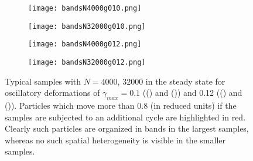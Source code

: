 \begin{figure}
	\centering
	\begin{subfigure}[b]{0.45\textwidth}
			\centering
			\texttt{[image: bandsN4000g010.png]}
			\caption{\label{fig:Band4000Small}}
	\end{subfigure}
	\begin{subfigure}[b]{0.45\textwidth}
			\centering
			\texttt{[image: bandsN32000g010.png]}
			\caption{\label{fig:Band32000Small}}
	\end{subfigure}
	\begin{subfigure}[b]{0.45\textwidth}
			\centering
			\texttt{[image: bandsN4000g012.png]}
			\caption{\label{fig:Band4000Large}}
	\end{subfigure} 
	\begin{subfigure}[b]{0.45\textwidth}
			\centering
			\texttt{[image: bandsN32000g012.png]}
			\caption{\label{fig:Band32000Large}}
	\end{subfigure}
	\caption{Typical samples with $N=4000$, $32000$ in the steady state for oscillatory deformations of $\gamma_{max} = 0.1$ (() and ()) and 0.12 (() and ()). Particles which move more than $0.8$ (in reduced units) if the samples are subjected to an additional cycle are highlighted in red. Clearly such particles are organized in bands in the largest samples, whereas no such spatial heterogeneity is visible in the smaller samples.
	\label{fig:ShearBands}}
\end{figure}

%


